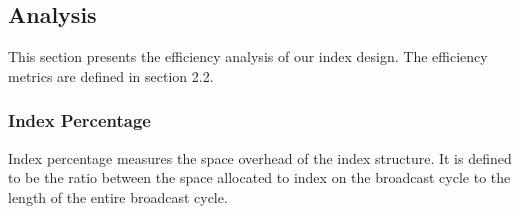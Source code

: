 



\subsection{Analysis}

This section presents the efficiency analysis of our index design.
The efficiency metrics are defined in section 2.2.

\subsubsection{Index Percentage}

Index percentage measures the space overhead of the index
structure. It is defined to be the ratio between the space
allocated to index on the broadcast cycle to the length of the
entire broadcast cycle.

